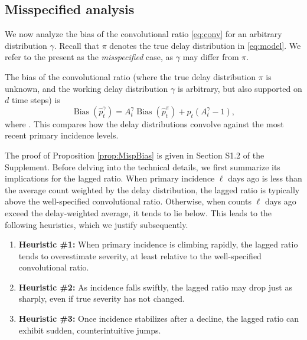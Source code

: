 \documentclass{article}
\renewcommand{\hat}{\widehat} %
\DeclareMathOperator{\bias}{Bias}
\begin{document}
\subsection{Misspecified analysis}
\label{sec:misspecified}

We now analyze the bias of the convolutional ratio \eqref{eq:conv} for an
arbitrary distribution $\gamma$. Recall that $\pi$ denotes the true delay
distribution in \eqref{eq:model}. We refer to the present as the
\emph{misspecified} case, as $\gamma$ may differ from $\pi$.    

\begin{proposition}
\label{prop:MispBias}
The bias of the convolutional ratio \smash{$\hat{p}_t^\gamma$} (where the true 
delay distribution $\pi$ is unknown, and the working delay distribution $\gamma$
is arbitrary, but also supported on $d$ time steps) is
\begin{equation}
\label{eq:MispBias}
\bias(\hat{p}_t^\gamma) = A_t^\gamma \bias(\hat{p}_t^\pi) + p_t (A_t^\gamma-1),  
\end{equation}
where . This compares how the delay distributions convolve against  
the most recent primary incidence levels. 
\end{proposition}

The proof of Proposition \ref{prop:MispBias} is given in 
Section S1.2 of the Supplement. 
Before delving into the technical details, we first summarize its implications for the lagged ratio.
When primary incidence $\ell$ days ago is less than the average count weighted by the delay distribution, 
the lagged ratio is typically above the well-specified convolutional ratio. 
Otherwise, when counts $\ell$ days ago exceed the delay-weighted average, 
it tends to lie below.
This leads to the following heuristics, which we justify subsequently.
\begin{enumerate}
    \item \textbf{Heuristic \#1:} When primary incidence is climbing rapidly, the lagged ratio tends to overestimate severity, at least relative to the well-specified convolutional ratio.
    \item \textbf{Heuristic \#2:} As incidence falls swiftly, the lagged ratio may drop just as sharply, even if true severity has not changed.
    \item \textbf{Heuristic \#3:} Once incidence stabilizes after a decline, the lagged ratio can exhibit sudden, counterintuitive jumps.
\end{enumerate}
\end{document}
